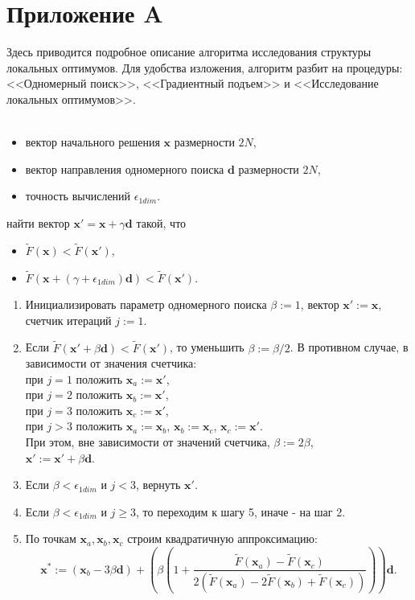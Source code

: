 \section*{Приложение A}\label{sec:applic_a}

Здесь приводится подробное описание алгоритма исследования структуры локальных оптимумов. Для удобства изложения, алгоритм разбит
на процедуры: <<Одномерный поиск>>, <<Градиентный подъем>> и <<Исследование локальных оптимумов>>.
\\ \\

\begin{itemize}
  \item вектор начального решения $\textbf{x}$ размерности $2N$,
  \item вектор направления одномерного поиска $\textbf{d}$ размерности $2N$,
  \item точность вычислений $\epsilon_{1dim}$.
\end{itemize}
 найти вектор $\textbf{x}' = \textbf{x} + \gamma \textbf{d}$ такой, что
\begin{itemize}
  \item $\tilde{F}(\textbf{x}) < \tilde{F}(\textbf{x}'),$
  \item $\tilde{F}(\textbf{x} + (\gamma + \epsilon_{1dim}) \textbf{d}) < \tilde{F}(\textbf{x}').$
\end{itemize}
\begin{enumerate}
  \item Инициализировать параметр одномерного поиска $\beta := 1$, вектор $\textbf{x}' := \textbf{x}$, счетчик итераций $j := 1$.
  \item Если $\tilde{F}(\textbf{x}' + \beta \textbf{d}) < \tilde{F}(\textbf{x}')$, то уменьшить $\beta := \beta / 2$.
  В противном случае, в зависимости от значения счетчика:\\
  при $j = 1$ положить $\textbf{x}_a := \textbf{x}'$,\\
  при $j = 2$ положить $\textbf{x}_b := \textbf{x}'$,\\
  при $j = 3$ положить $\textbf{x}_c := \textbf{x}'$,\\
  при $j > 3$ положить $\textbf{x}_a := \textbf{x}_b$, $\textbf{x}_b := \textbf{x}_c$, $\textbf{x}_c := \textbf{x}'$.\\
  При этом, вне зависимости от значений счетчика, $\beta := 2\beta$,\\
  $\textbf{x}' := \textbf{x}' + \beta \textbf{d}.$
  \item Если $\beta < \epsilon_{1dim}$ и $j < 3$, вернуть $\textbf{x}'$.
  \item Если $\beta < \epsilon_{1dim}$ и $j \geq 3$, то переходим к шагу 5, иначе - на шаг 2.
  \item По точкам $\textbf{x}_a, \textbf{x}_b, \textbf{x}_c$ строим квадратичную аппроксимацию:
   $$\textbf{x}^{*} := (\textbf{x}_b - 3 \beta \textbf{d}) +
   \left(\beta\left(1 + \frac{\tilde{F}(\textbf{x}_a) - \tilde{F}(\textbf{x}_c)}{2(\tilde{F}(\textbf{x}_a) -
   2\tilde{F}(\textbf{x}_b) + \tilde{F}(\textbf{x}_c))}\right)\right)\textbf{d}.$$\\
\end{enumerate}
